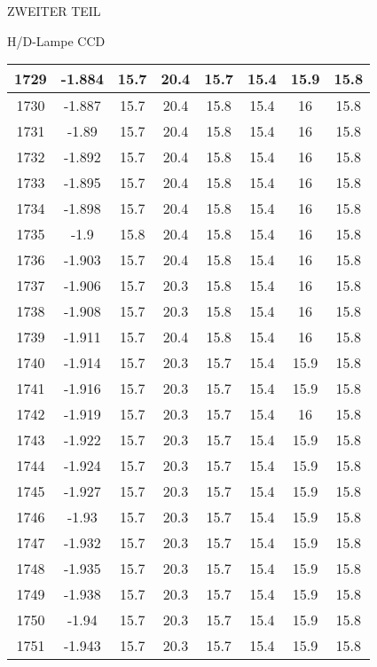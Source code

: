 \begin{appendix}
\begin{chapter}{ZWEITER TEIL}
\begin{section}{H/D-Lampe CCD}
\begin{scriptsize}
\begin{longtable}[htbp]{|c|c|c|c|c|c|c|c|}
            1729 & -1.884 & 15.7 & 20.4 & 15.7 & 15.4 & 15.9 & 15.8 \\ \hline
            1730 & -1.887 & 15.7 & 20.4 & 15.8 & 15.4 & 16 & 15.8 \\ \hline
            1731 & -1.89 & 15.7 & 20.4 & 15.8 & 15.4 & 16 & 15.8 \\ \hline
            1732 & -1.892 & 15.7 & 20.4 & 15.8 & 15.4 & 16 & 15.8 \\ \hline
            1733 & -1.895 & 15.7 & 20.4 & 15.8 & 15.4 & 16 & 15.8 \\ \hline
            1734 & -1.898 & 15.7 & 20.4 & 15.8 & 15.4 & 16 & 15.8 \\ \hline
            1735 & -1.9 & 15.8 & 20.4 & 15.8 & 15.4 & 16 & 15.8 \\ \hline
            1736 & -1.903 & 15.7 & 20.4 & 15.8 & 15.4 & 16 & 15.8 \\ \hline
            1737 & -1.906 & 15.7 & 20.3 & 15.8 & 15.4 & 16 & 15.8 \\ \hline
            1738 & -1.908 & 15.7 & 20.3 & 15.8 & 15.4 & 16 & 15.8 \\ \hline
            1739 & -1.911 & 15.7 & 20.4 & 15.8 & 15.4 & 16 & 15.8 \\ \hline
            1740 & -1.914 & 15.7 & 20.3 & 15.7 & 15.4 & 15.9 & 15.8 \\ \hline
            1741 & -1.916 & 15.7 & 20.3 & 15.7 & 15.4 & 15.9 & 15.8 \\ \hline
            1742 & -1.919 & 15.7 & 20.3 & 15.7 & 15.4 & 16 & 15.8 \\ \hline
            1743 & -1.922 & 15.7 & 20.3 & 15.7 & 15.4 & 15.9 & 15.8 \\ \hline
            1744 & -1.924 & 15.7 & 20.3 & 15.7 & 15.4 & 15.9 & 15.8 \\ \hline
            1745 & -1.927 & 15.7 & 20.3 & 15.7 & 15.4 & 15.9 & 15.8 \\ \hline
            1746 & -1.93 & 15.7 & 20.3 & 15.7 & 15.4 & 15.9 & 15.8 \\ \hline
            1747 & -1.932 & 15.7 & 20.3 & 15.7 & 15.4 & 15.9 & 15.8 \\ \hline
            1748 & -1.935 & 15.7 & 20.3 & 15.7 & 15.4 & 15.9 & 15.8 \\ \hline
            1749 & -1.938 & 15.7 & 20.3 & 15.7 & 15.4 & 15.9 & 15.8 \\ \hline
            1750 & -1.94 & 15.7 & 20.3 & 15.7 & 15.4 & 15.9 & 15.8 \\ \hline
            1751 & -1.943 & 15.7 & 20.3 & 15.7 & 15.4 & 15.9 & 15.8 \\ \hline

\end{longtable}
\end{scriptsize}
\end{section}
\end{chapter}
\end{appendix}
